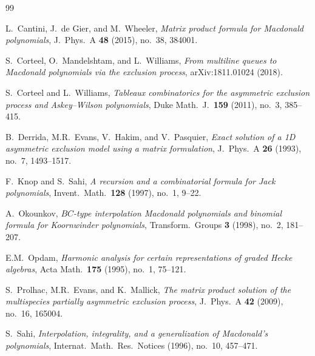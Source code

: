 \documentclass[12pt]{article}
\begin{document}
\begin{thebibliography}{99}

L.\ Cantini, J.\ de Gier, and M.\ Wheeler,
\textit{Matrix product formula for Macdonald polynomials},
J.\ Phys.\ A \textbf{48} (2015), no.\ 38, 384001.

S.\ Corteel, O.\ Mandelshtam, and L.\ Williams,
\textit{From multiline queues to Macdonald polynomials via the exclusion process},
arXiv:1811.01024 (2018).

S.\ Corteel and L.\ Williams,
\textit{Tableaux combinatorics for the asymmetric exclusion process and Askey--Wilson polynomials},
Duke Math.\ J.\ \textbf{159} (2011), no.\ 3, 385--415.

B.\ Derrida, M.R.\ Evans, V.\ Hakim, and V.\ Pasquier,
\textit{Exact solution of a 1D asymmetric exclusion model using a matrix formulation},
J.\ Phys.\ A \textbf{26} (1993), no.\ 7, 1493--1517.

F.\ Knop and S.\ Sahi,
\textit{A recursion and a combinatorial formula for Jack polynomials},
Invent.\ Math.\ \textbf{128} (1997), no.\ 1, 9--22.

A.\ Okounkov,
\textit{$BC$-type interpolation Macdonald polynomials and binomial formula for Koornwinder polynomials},
Transform.\ Groups \textbf{3} (1998), no.\ 2, 181--207.

E.M.\ Opdam,
\textit{Harmonic analysis for certain representations of graded Hecke algebras},
Acta Math.\ \textbf{175} (1995), no.\ 1, 75--121.

S.\ Prolhac, M.R.\ Evans, and K.\ Mallick,
\textit{The matrix product solution of the multispecies partially asymmetric exclusion process},
J.\ Phys.\ A \textbf{42} (2009), no.\ 16, 165004.

S.\ Sahi,
\textit{Interpolation, integrality, and a generalization of Macdonald's polynomials},
Internat.\ Math.\ Res.\ Notices (1996), no.\ 10, 457--471.

\end{thebibliography}
\end{document}
